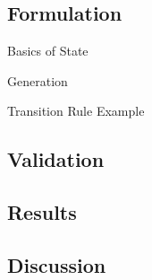 \subsection{Formulation}
\begin{frame}{Basics of State}
\end{frame}

\begin{frame}{Generation}
\end{frame}

\begin{frame}{Transition Rule Example}
\end{frame}

\subsection{Validation}

\subsection{Results}

\subsection{Discussion}
